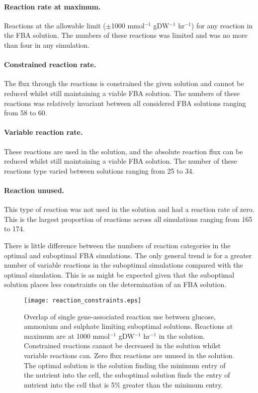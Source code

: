 \paragraph{Reaction rate at maximum.} Reactions at the allowable limit ($\pm$1000 mmol$^{-1}$ gDW$^{-1}$ hr$^{-1}$) for any reaction in the FBA solution. The numbers of these reactions was limited and was no more than four in any simulation.

\paragraph{Constrained reaction rate.} The flux through the reactions is constrained the given solution and cannot be reduced whilst still maintaining a viable FBA solution. The numbers of these reactions was relatively invariant between all considered FBA solutions ranging from 58 to 60.

\paragraph{Variable reaction rate.} These reactions are used in the solution, and the absolute reaction flux can be reduced whilst still maintaining a viable FBA solution. The number of these reactions type varied between solutions ranging from 25 to 34.

\paragraph{Reaction unused.} This type of reaction was not used in the solution and had a reaction rate of zero. This is the largest proportion of reactions across all simulations ranging from 165 to 174.

There is little difference between the numbers of reaction categories in the optimal and suboptimal FBA simulations. The only general trend is for a greater number of variable reactions in the suboptimal simulations compared with the optimal simulation. This is as might be expected given that the suboptimal solution places less constraints on the determination of an FBA solution.

\begin{figure}%
  \centering
  \texttt{[image: reaction\_constraints.eps]}
  \caption[Overlap of reaction type between glucose, ammonium and sulphate limiting conditions. ]{Overlap of single gene-associated reaction use between glucose, ammonium and sulphate limiting suboptimal solutions. Reactions at maximum are at 1000 mmol$^{-1}$ gDW$^{-1}$ hr$^{-1}$ in the solution. Constrained reactions cannot be decreased in the solution whilst variable reactions can. Zero flux reactions are unused in the solution. The optimal solution is the solution finding the minimum entry of the nutrient into the cell, the suboptimal solution finds the entry of nutrient into the cell that is 5\% greater than the minimum entry. }
  \label{figure:reaction_constraints}
\end{figure}%

